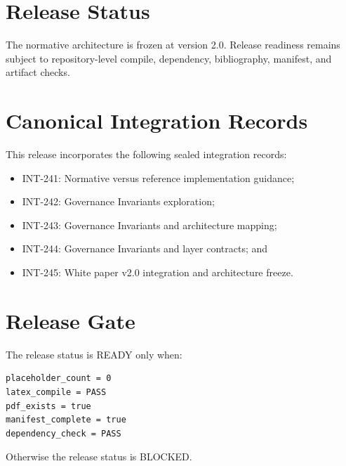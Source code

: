 \documentclass[11pt,a4paper]{article}
\begin{document}
\section{Release Status}

The normative architecture is frozen at version 2.0. Release readiness remains subject to repository-level compile, dependency, bibliography, manifest, and artifact checks.

\appendix

\section{Canonical Integration Records}

This release incorporates the following sealed integration records:

\begin{itemize}[leftmargin=*]
  \item INT-241: Normative versus reference implementation guidance;
  \item INT-242: Governance Invariants exploration;
  \item INT-243: Governance Invariants and architecture mapping;
  \item INT-244: Governance Invariants and layer contracts; and
  \item INT-245: White paper v2.0 integration and architecture freeze.
\end{itemize}

\section{Release Gate}

The release status is READY only when:

\begin{verbatim}
placeholder_count = 0
latex_compile = PASS
pdf_exists = true
manifest_complete = true
dependency_check = PASS
\end{verbatim}

Otherwise the release status is BLOCKED.



\end{document}
